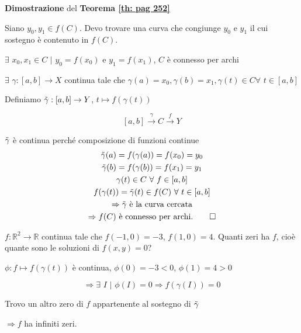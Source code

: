 	
\begin{dembar}
	\textbf{Dimostrazione} del \textbf{Teorema \ref{th: pag 252}}
	
	Siano $y_0,y_1 \in f(C)$. Devo trovare una curva che congiunge $y_0$ e $y_1$ il cui sostegno è contenuto in $f(C)$. 
	
	$\exists \,\, x_0,x_1 \in C\,\, \big|\,\, y_0= f(x_0)$ e $y_1=f(x_1)$, $C$ è connesso per archi
	
	$\exists\,\, \gamma:[a,b]\rightarrow X$ continua tale che $\gamma(a)=x_0, \gamma(b)=x_1, \gamma(t)\in C \forall\,\, t \in [a,b]$
	
	Definiamo $\Tilde{\gamma}:[a,b] \rightarrow Y$, $t \mapsto f(\gamma(t))$
	
	$$[a,b]\xrightarrow{\gamma} C \xrightarrow{f}Y$$
	
	$\Tilde{\gamma}$ è continua perché composizione di funzioni continue
	\begin{gather*} 
		\Tilde{\gamma}(a)=f(\gamma(a))=f(x_0)=y_0
		\\
		\Tilde{\gamma}(b)=f(\gamma(b))=f(x_1)=y_1
		\\
		\gamma(t)\in C\,\, \forall\,\, f \in [a,b]
		\\
		f(\gamma(t))=\Tilde{\gamma}(t)\in f(C)\,\,\forall\,\,t \in [a,b]
		\\
		\Rightarrow \Tilde{\gamma} \text{ è la curva cercata}
		\\
		\Rightarrow f(C) \text{ è connesso per archi.} \qquad \square
	\end{gather*}
	
\end{dembar}
	
	
\begin{exbar}
	$f:\mathbb{R}^2\rightarrow \mathbb{R}$ continua tale che $f(-1,0)=-3$, $f(1,0)=4$. Quanti zeri ha $f$, cioè quante sono le soluzioni di $f(x,y)=0$?
	
	
	{\color{blue}$\phi : f \mapsto f(\gamma(t))$ è continua, $\phi(0)=-3 <0$, $\phi(1)=4 >0$
	
	$$\Rightarrow \exists\,\, I\,\, \big| \,\, \phi(I)=0 \Rightarrow f(\gamma(I))=0$$
	
	Trovo un altro zero di $f$ appartenente al sostegno di $\Tilde{\gamma}$} 
	
	\begin{center} $\Rightarrow f$ ha infiniti zeri. \end{center} 
\end{exbar}	

